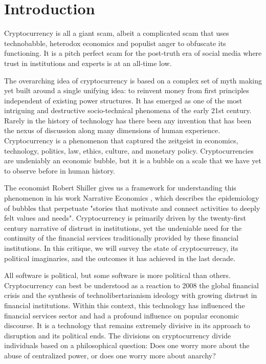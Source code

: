 \chapter{Introduction}

Cryptocurrency is all a giant scam, albeit a complicated scam that uses
technobabble, heterodox economics and populist anger to obfuscate its
functioning. It is a pitch perfect scam for the post-truth era of social media
where trust in institutions and experts is at an all-time low.

The overarching idea of cryptocurrency is based on a complex set of myth making
yet built around a single unifying idea: to reinvent money from first principles
independent of existing power structures. It has emerged as one of the most
intriguing and destructive socio-technical phenomena of the early 21st century.
Rarely in the history of technology has there been any invention that has been
the nexus of discussion along many dimensions of human experience.
Cryptocurrency is a phenomenon that captured the zeitgeist in economics,
technology, politics, law, ethics, culture, and monetary policy.
Cryptocurrencies are undeniably an economic bubble, but it is a bubble on a
scale that we have yet to observe before in human history.

The economist Robert Shiller gives us a framework for understanding this
phenomenon in his work Narrative Economics \cite{shiller_narrative_2017}, which
describes the epidemiology of bubbles that perpetuate "stories that motivate and
connect activities to deeply felt values and needs". Cryptocurrency is primarily
driven by the twenty-first century narrative of distrust in institutions, yet
the undeniable need for the continuity of the financial services traditionally
provided by these financial institutions. In this critique, we will survey the
state of cryptocurrency, its political imaginaries, and the outcomes it has
achieved in the last decade.

All software is political, but some software is more political than others.
Cryptocurrency can best be understood as a reaction to 2008 the global financial
crisis and the synthesis of technolibertarianism ideology with growing distrust
in financial institutions. Within this context, this technology has influenced
the financial services sector and had a profound influence on popular economic
discourse. It is a technology that remains extremely divisive in its approach to
disruption and its political ends. The divisions on cryptocurrency divide
individuals based on a philosophical question: Does one worry more about the
abuse of centralized power, or does one worry more about anarchy?

